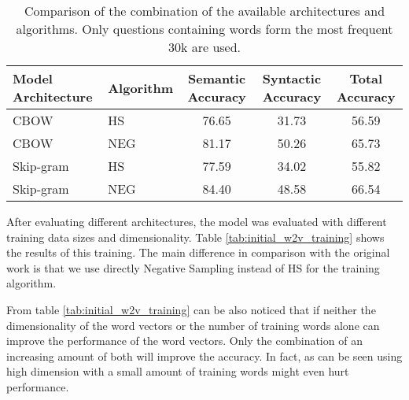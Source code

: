 \begin{table}[h]
\centering
\caption{Comparison of the combination of the available architectures and algorithms.
 Only questions containing words form the most  frequent 30k are used.} 
\label{tab:initial_w2v_comparison}


\begin{center}
\small

\begin{tabular}{|l|l|c|c|c|}
\hline
 Model Architecture  &   Algorithm  &  Semantic Accuracy  &  Syntactic Accuracy  &  Total Accuracy  \\
\hline
 CBOW               &  HS                   &              76.65  &               31.73  &           56.59  \\
 CBOW               &  NEG                  &              81.17  &               50.26  &           65.73  \\
 Skip-gram          &  HS                   &              77.59  &               34.02  &           55.82  \\
 Skip-gram          &  NEG                  &              84.40  &               48.58  &           66.54  \\
\hline
\end{tabular}
\end{center}

\end{table}


After evaluating different architectures, the  model was evaluated with
different  training data sizes and dimensionality. Table
\ref{tab:initial_w2v_training}  shows the results of this training. The main
difference in comparison with the original work is that we use directly
Negative Sampling  instead of \ac{HS} for the training algorithm. 


From table \ref{tab:initial_w2v_training} can be also noticed that if 
neither the dimensionality of the word vectors or the number of
training words alone can improve the performance of the word vectors. Only the
combination of an increasing amount of both will improve the accuracy. In
fact, as can be seen using high dimension with a small amount of training
words might even hurt performance.


